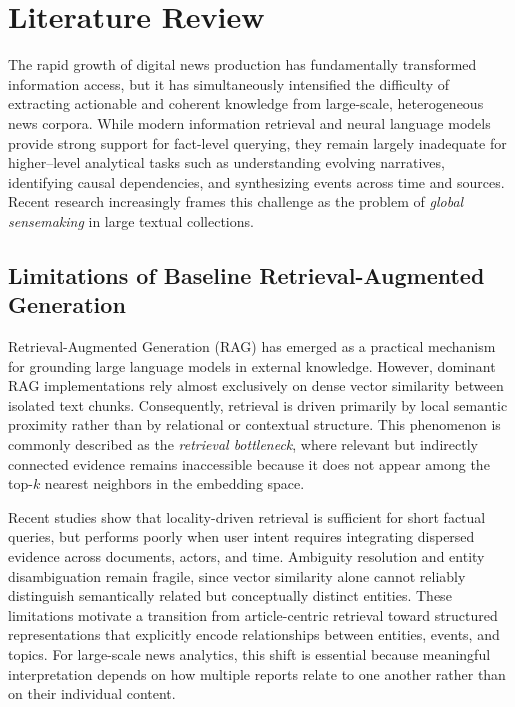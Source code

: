 \documentclass[preprint,10pt]{article}
\begin{document}
\section{Literature Review}

The rapid growth of digital news production has fundamentally transformed information access, but it has simultaneously intensified the difficulty of extracting actionable and coherent knowledge from large-scale, heterogeneous news corpora. While modern information retrieval and neural language models provide strong support for fact-level querying, they remain largely inadequate for higher–level analytical tasks such as understanding evolving narratives, identifying causal dependencies, and synthesizing events across time and sources\cite{Haque2025}. Recent research increasingly frames this challenge as the problem of \emph{global sensemaking} in large textual collections\cite{Mosolygo2025}.

\subsection{Limitations of Baseline Retrieval-Augmented Generation}

Retrieval-Augmented Generation (RAG) has emerged as a practical mechanism for grounding large language models in external knowledge. However, dominant RAG implementations rely almost exclusively on dense vector similarity between isolated text chunks. Consequently, retrieval is driven primarily by local semantic proximity rather than by relational or contextual structure. This phenomenon is commonly described as the \emph{retrieval bottleneck}\cite{Kim2025}, where relevant but indirectly connected evidence remains inaccessible because it does not appear among the top-$k$ nearest neighbors in the embedding space.

Recent studies show that locality-driven retrieval is sufficient for short factual queries, but performs poorly when user intent requires integrating dispersed evidence across documents, actors, and time. Ambiguity resolution and entity disambiguation remain fragile, since vector similarity alone cannot reliably distinguish semantically related but conceptually distinct entities\cite{Edge2025}. These limitations motivate a transition from article-centric retrieval toward structured representations that explicitly encode relationships between entities, events, and topics. For large-scale news analytics, this shift is essential because meaningful interpretation depends on how multiple reports relate to one another rather than on their individual content.
\end{document}
